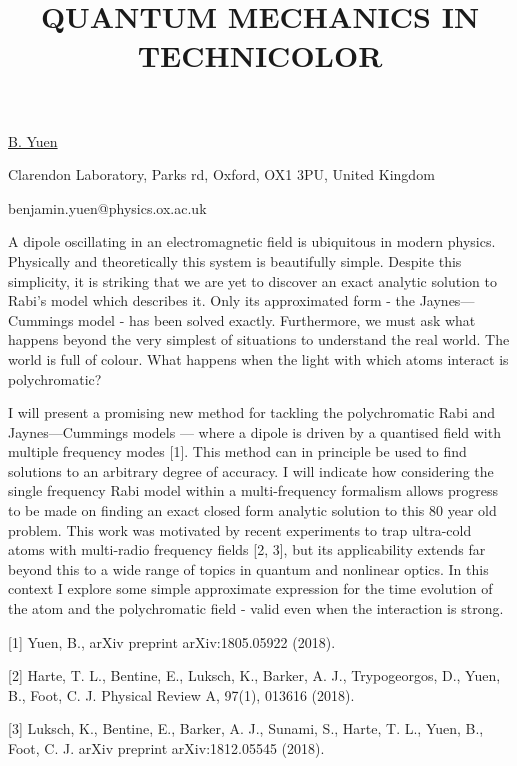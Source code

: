 \title{QUANTUM MECHANICS IN TECHNICOLOR}

\underline{B. Yuen}  

{\normalsize{\vspace{-4mm}
Clarendon Laboratory,
Parks rd,
Oxford,
OX1 3PU,
United Kingdom



\email benjamin.yuen@physics.ox.ac.uk}}

A dipole oscillating in an electromagnetic field is ubiquitous in modern physics. Physically and theoretically this system is beautifully simple. Despite this simplicity, it is striking that we are yet to discover an exact analytic solution to Rabi’s model which describes it. Only its approximated form - the Jaynes—Cummings model - has been solved exactly. Furthermore, we must ask what happens beyond the very simplest of situations to understand the real world.  The world is full of colour. What happens when the light with which atoms interact is polychromatic?

I will present a promising new method for tackling the polychromatic Rabi and Jaynes—Cummings models — where a dipole is driven by a quantised field with multiple frequency modes [1]. This method can in principle be used to find solutions to an arbitrary degree of accuracy. I will indicate how considering the single frequency Rabi model within a multi-frequency formalism allows progress to be made on finding an exact closed form analytic solution to this 80 year old problem. This work was motivated by recent experiments to trap ultra-cold atoms with multi-radio frequency fields [2, 3], but its applicability extends far beyond this to a wide range of topics in quantum and nonlinear optics. In this context I explore some simple approximate expression for the time evolution of the atom and the polychromatic field - valid even when the interaction is strong.

{\normalsize
[1] Yuen, B., arXiv preprint arXiv:1805.05922 (2018).
\vsp

[2] Harte, T. L., Bentine, E., Luksch, K., Barker, A. J., Trypogeorgos, D., Yuen, B., Foot, C. J. Physical Review A, 97(1), 013616 (2018).
\vsp

[3] Luksch, K., Bentine, E., Barker, A. J., Sunami, S., Harte, T. L., Yuen, B., Foot, C. J. arXiv preprint arXiv:1812.05545 (2018).
}

\vspace{\baselineskip}